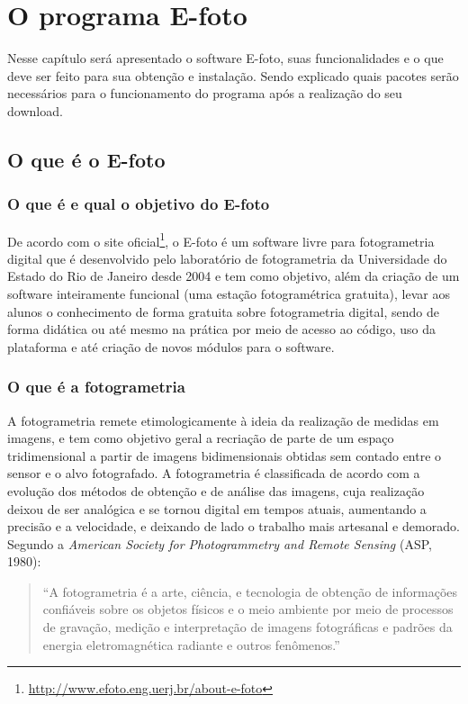 \chapter{O programa E-foto}

Nesse capítulo será apresentado o software E-foto, suas funcionalidades e o que deve ser feito para sua obtenção e instalação. Sendo explicado quais pacotes serão necessários para o funcionamento do programa após a realização do seu download.

\section{O que é o E-foto}
\subsection{O que é e qual o objetivo do E-foto}
De acordo com o site oficial\footnote{\url{http://www.efoto.eng.uerj.br/about-e-foto}}, o E-foto é um software livre para fotogrametria digital que é desenvolvido pelo laboratório de fotogrametria da Universidade do Estado do Rio de Janeiro desde 2004 e tem como objetivo, além da criação de um software inteiramente funcional (uma estação fotogramétrica gratuita), levar aos alunos o conhecimento de forma gratuita sobre fotogrametria digital, sendo de forma didática ou até mesmo na prática por meio de acesso ao código, uso da plataforma e até criação de novos módulos para o software.

\subsection{O que é a fotogrametria}
A fotogrametria remete etimologicamente à ideia da realização de medidas em imagens, e tem como objetivo geral a recriação de parte de um espaço tridimensional a partir de imagens bidimensionais obtidas sem contado entre o sensor e o alvo fotografado. A fotogrametria é classificada de acordo com a evolução dos métodos de obtenção e de análise das imagens, cuja realização deixou de ser analógica e se tornou digital em tempos atuais, aumentando a precisão e a velocidade, e deixando de lado o trabalho mais artesanal e demorado.
Segundo a \textit{American Society for Photogrammetry and Remote Sensing} (ASP, 1980):

\begin{quote}
	``A fotogrametria é a arte, ciência, e tecnologia de obtenção de informações confiáveis sobre os objetos físicos e o meio ambiente por meio de processos de gravação, medição e interpretação de imagens fotográficas e padrões da energia eletromagnética radiante e outros fenômenos.''
\end{quote}

